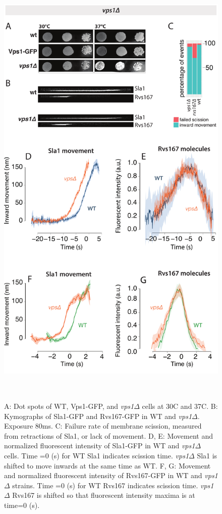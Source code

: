 	\begin{figure}
	\centering
	\includegraphics[width=22cm,height=22cm,keepaspectratio]{figures/results_final/vps}
	\caption[Rvs localization in vps deletion]
	{A: Dot spots of WT, Vps1-GFP, and \textit{vps1$\Delta$} cells at 30C and 37C. 
		B: Kymographs of Sla1-GFP and Rvs167-GFP in WT and \textit{vps1$\Delta$}. Exposure 80ms.  
		C: Failure rate of membrane scission, measured from retractions of Sla1, or lack of movement. 
		D, E: Movement and normalized fluorescent intensity of Sla1-GFP in WT and \textit{vps1$\Delta$} cells. Time =0 (s) for WT Sla1 indicates scission time. \textit{vps1$\Delta$} Sla1  is shifted to move inwards at the same time as WT. 
		F, G: Movement and normalized fluorescent intensity of Rvs167-GFP in WT and \textit{vps1$\Delta$} strains. Time =0 (s) for WT Rvs167 indicates scission time. \textit{vps1$\Delta$} Rvs167 is shifted so that fluorescent intensity maxima is at time=0 (s).
		\label{fig4_vpsdel}}
	\end{figure}
	
